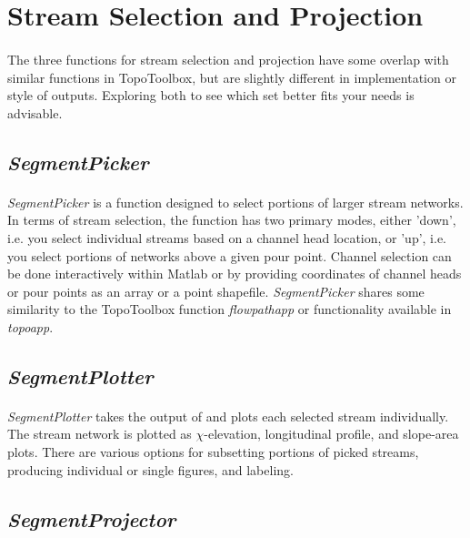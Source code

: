 \section{Stream Selection and Projection}

\paragraph{}The three functions for stream selection and projection have some overlap with similar functions in TopoToolbox, but are slightly different in implementation or style of outputs. Exploring both to see which set better fits your needs is advisable.

\subsection{\textit{SegmentPicker}} \label{sec:SegPick}
\paragraph{}\textit{SegmentPicker} is a function designed to select portions of larger stream networks. In terms of stream selection, the function has two primary modes, either 'down', i.e. you select individual streams based on a channel head location, or 'up', i.e. you select portions of networks above a given pour point. Channel selection can be done interactively within Matlab or by providing coordinates of channel heads or pour points as an array or a point shapefile. \textit{SegmentPicker} shares some similarity to the TopoToolbox function \textit{flowpathapp} or functionality available in \textit{topoapp}.

\subsection{\textit{SegmentPlotter}}
\paragraph{}\textit{SegmentPlotter} takes the output of  and plots each selected stream individually. The stream network is plotted as $\chi$-elevation, longitudinal profile, and slope-area plots. There are various options for subsetting portions of picked streams, producing individual or single figures, and labeling.

\subsection{\textit{SegmentProjector}}


